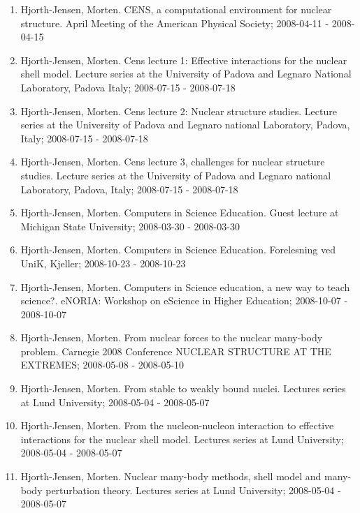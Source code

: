 \documentclass[%
oneside,                 %
final,                   %
10pt]{article}
\begin{document}
\begin{enumerate}
\item Hjorth-Jensen, Morten.  CENS, a computational environment for nuclear structure. April Meeting of the American Physical Society; 2008-04-11 - 2008-04-15

\item Hjorth-Jensen, Morten.  Cens lecture 1: Effective interactions for the nuclear shell model. Lecture series at the University of Padova and Legnaro National Laboratory, Padova Italy; 2008-07-15 - 2008-07-18

\item Hjorth-Jensen, Morten.  Cens lecture 2: Nuclear structure studies. Lecture series at the University of Padova and Legnaro national Laboratory, Padova, Italy; 2008-07-15 - 2008-07-18

\item Hjorth-Jensen, Morten.  Cens lecture 3, challenges for nuclear structure studies. Lecture series at the University of Padova and Legnaro national Laboratory, Padova, Italy; 2008-07-15 - 2008-07-18

\item Hjorth-Jensen, Morten.  Computers in Science Education. Guest lecture at Michigan State University; 2008-03-30 - 2008-03-30

\item Hjorth-Jensen, Morten.  Computers in Science Education. Forelesning ved UniK, Kjeller; 2008-10-23 - 2008-10-23

\item Hjorth-Jensen, Morten.  Computers in Science education, a new way to teach science?. eNORIA: Workshop on eScience in Higher Education; 2008-10-07 - 2008-10-07

\item Hjorth-Jensen, Morten.  From nuclear forces to the nuclear many-body problem. Carnegie 2008 Conference NUCLEAR STRUCTURE AT THE EXTREMES; 2008-05-08 - 2008-05-10

\item Hjorth-Jensen, Morten.  From stable to weakly bound nuclei. Lectures series at Lund University; 2008-05-04 - 2008-05-07

\item Hjorth-Jensen, Morten.  From the nucleon-nucleon interaction to effective interactions for the nuclear shell model. Lectures series at Lund University; 2008-05-04 - 2008-05-07

\item Hjorth-Jensen, Morten.  Nuclear many-body methods, shell model and many-body perturbation theory. Lectures series at Lund University; 2008-05-04 - 2008-05-07


\end{enumerate}
\end{document}

